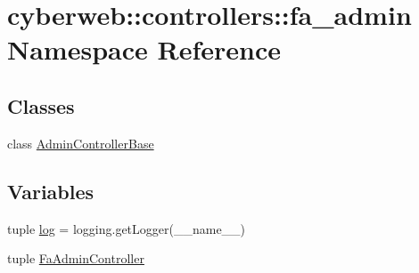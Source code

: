 \hypertarget{namespacecyberweb_1_1controllers_1_1fa__admin}{\section{cyberweb\-:\-:controllers\-:\-:fa\-\_\-admin \-Namespace \-Reference}
\label{namespacecyberweb_1_1controllers_1_1fa__admin}
}
\subsection*{\-Classes}
\begin{DoxyCompactItemize}
\item 
class \hyperlink{classcyberweb_1_1controllers_1_1fa__admin_1_1_admin_controller_base}{\-Admin\-Controller\-Base}
\end{DoxyCompactItemize}
\subsection*{\-Variables}
\begin{DoxyCompactItemize}
\item 
tuple \hyperlink{namespacecyberweb_1_1controllers_1_1fa__admin_a2b4a9ca0cc2ec112076b1dd88bf56bbb}{log} = logging.\-get\-Logger(\-\_\-\-\_\-name\-\_\-\-\_\-)
\item 
tuple \hyperlink{namespacecyberweb_1_1controllers_1_1fa__admin_ac7a3e431d03b1d894e586decd1ca3787}{\-Fa\-Admin\-Controller}
\end{DoxyCompactItemize}


